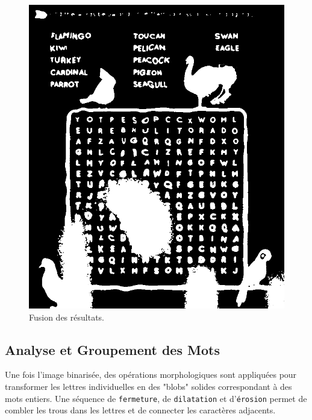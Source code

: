 \documentclass{article}
\begin{document}
\begin{figure}[H]
    \includegraphics[width=\linewidth]{ressources/image_3_word_detection_06_combined_threshold.png}
    \caption{}
  \endminipage
  \caption{Fusion des résultats.}
\end{figure}
\subsection{Analyse et Groupement des Mots}
Une fois l'image binarisée, des opérations morphologiques sont appliquées pour transformer les lettres individuelles en des "blobs" solides correspondant à des mots entiers. Une séquence de \texttt{fermeture}, de \texttt{dilatation} et d'\texttt{érosion} permet de combler les trous dans les lettres et de connecter les caractères adjacents.
\end{document}
